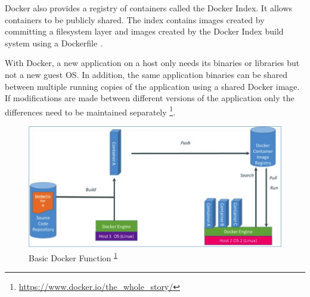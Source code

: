 \documentclass[a4paper,11pt,twoside]{article}
\begin{document}
Docker also provides a registry of containers called the Docker Index. It allows containers to be publicly shared. The index contains images created by committing a filesystem layer and images created by the Docker Index build system using a Dockerfile \cite{docker2}.
   
With Docker, a new application on a host only needs its binaries or libraries but not a new guest OS. In addition, the same application binaries can be shared between multiple running copies of the application using a shared Docker image. If modifications are made between different versions of the application only the differences need to be maintained separately \footnote{\label{dockerC} \url{https://www.docker.io/the_whole_story/}}. \\

\begin{figure}[!ht]
  \centering
     \includegraphics[scale=1]{docker}
  \caption{Basic Docker Function \textsuperscript{\ref{dockerC}}} %
  \label{docker}
\end{figure}
\vspace{-18pt}

\end{document}
